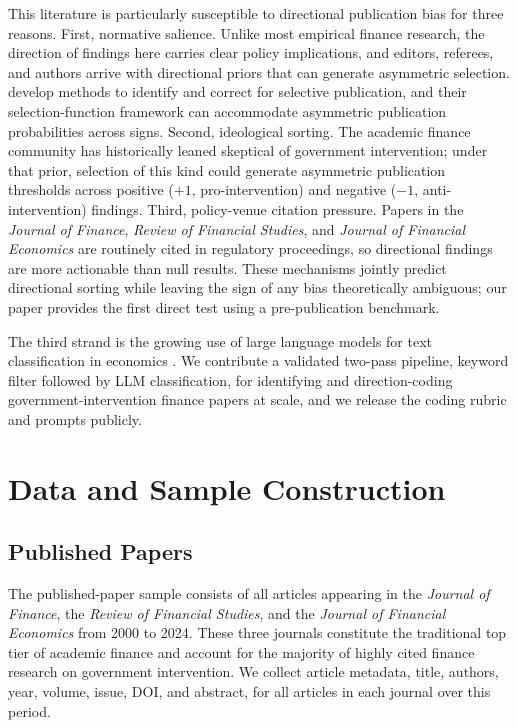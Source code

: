 \documentclass[12pt]{article}
\newcommand{\JF}{\textit{Journal of Finance}}
\newcommand{\RFS}{\textit{Review of Financial Studies}}
\newcommand{\JFE}{\textit{Journal of Financial Economics}}
\begin{document}
This literature is particularly susceptible to directional publication
bias for three reasons.  First, normative salience.  Unlike most
empirical finance research, the direction of findings here carries
clear policy implications, and editors, referees, and authors arrive
with directional priors that can generate asymmetric selection.
\citet*{Andrews2019} develop methods to identify and correct for
selective publication, and their selection-function framework can
accommodate asymmetric publication probabilities across signs.
Second, ideological sorting.  The academic finance community has
historically leaned skeptical of government intervention; under that
prior, selection of this kind could generate asymmetric publication
thresholds across positive ($+1$, pro-intervention) and negative
($-1$, anti-intervention) findings.  Third, policy-venue
citation pressure.  Papers in the \JF{}, \RFS{}, and \JFE{} are
routinely cited in regulatory proceedings, so directional findings are
more actionable than null results.  These mechanisms jointly predict
directional sorting while leaving the sign of any bias theoretically
ambiguous; our paper provides the first direct test using a
pre-publication benchmark.

The third strand is the growing use of large language models for text
classification in economics \citep*{Ash2023, Korinek2023}.  We contribute a
validated two-pass pipeline, keyword filter followed by LLM classification, for
identifying and direction-coding government-intervention finance papers at scale,
and we release the coding rubric and prompts publicly.

\section{Data and Sample Construction}
\label{sec:data}

\subsection{Published Papers}

The published-paper sample consists of all articles appearing in the \JF{},
the \RFS{}, and the \JFE{} from 2000 to 2024.  These three journals constitute
the traditional top tier of academic finance and account for the majority of
highly cited finance research on government intervention.  We collect article
metadata, title, authors, year, volume, issue, DOI, and abstract, for all
articles in each journal over this period.
\end{document}
